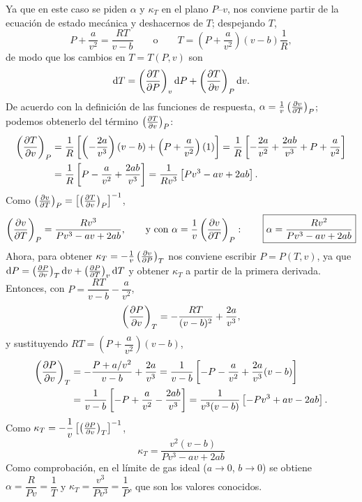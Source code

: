 \begin{solucion}
  Ya que en este caso se piden $\alpha$ y $\kappa_T$ en el plano $P$--$v$, nos conviene partir de la
  ecuación de estado mecánica y deshacernos de $T$; despejando $T$,
  \begin{equation*}
    P+\frac{a}{v^{2}}=\frac{RT}{v-b}\qquad\text{o}\qquad T=\left(P+\frac{a}{v^{2}}\right)(v-b)\frac{1}{R},
  \end{equation*}
  de modo que los cambios en $T=T(P,v)$ son
  \begin{equation*}
    \dd T=\left(\frac{\partial T}{\partial P}\right)_{v}\dd P+\left(\frac{\partial T}{\partial v}\right)_{P}\dd v.
  \end{equation*}
  De acuerdo con la definición de las funciones de respuesta, $\alpha=\frac{1}{v}\left(\frac{\partial v}{\partial T}\right)_{P}$;
  podemos obtenerlo del término $\left(\frac{\partial T}{\partial v}\right)_{P}$:
  \begin{align*}
    \left(\frac{\partial T}{\partial v}\right)_{P}&=\frac{1}{R}\left[\left(-\frac{2a}{v^{3}}\right)(v-b)+\left(P+\frac{a}{v^{2}}\right)(1)\right]
      =\frac{1}{R}\left[-\frac{2a}{v^{2}}+\frac{2ab}{v^{3}}+P+\frac{a}{v^{2}}\right]\\
    &=\frac{1}{R}\left[P-\frac{a}{v^{2}}+\frac{2ab}{v^{3}}\right]
     =\frac{1}{Rv^{3}}\left[Pv^{3}-av+2ab\right].
  \end{align*}
  Como $\left(\frac{\partial v}{\partial T}\right)_{P}=\left[\left(\frac{\partial T}{\partial v}\right)_{P}\right]^{-1}$,
  \begin{equation*}
    \left(\frac{\partial v}{\partial T}\right)_{P}=\frac{Rv^{3}}{Pv^{3}-av+2ab},
    \qquad\text{y con }\alpha=\frac{1}{v}\left(\frac{\partial v}{\partial T}\right)_{P}:\qquad
    \boxed{\alpha=\frac{Rv^{2}}{Pv^{3}-av+2ab}}
  \end{equation*}
  Ahora, para obtener $\kappa_T=-\frac{1}{v}\left(\frac{\partial v}{\partial P}\right)_{T}$ nos conviene escribir $P=P(T,v)$, ya que
  $\dd P=\left(\frac{\partial P}{\partial v}\right)_{T}\dd v+\left(\frac{\partial P}{\partial T}\right)_{v}\dd T$ y obtener $\kappa_T$ a partir de la primera
  derivada. Entonces, con $P=\dfrac{RT}{v-b}-\dfrac{a}{v^{2}}$,
  \begin{equation*}
    \left(\frac{\partial P}{\partial v}\right)_{T}=-\frac{RT}{(v-b)^{2}}+\frac{2a}{v^{3}},
  \end{equation*}
  y sustituyendo $RT=\left(P+\dfrac{a}{v^{2}}\right)(v-b)$,
  \begin{align*}
    \left(\frac{\partial P}{\partial v}\right)_{T}&=-\frac{P+a/v^{2}}{v-b}+\frac{2a}{v^{3}}
      =\frac{1}{v-b}\left[-P-\frac{a}{v^{2}}+\frac{2a}{v^{3}}(v-b)\right]\\
    &=\frac{1}{v-b}\left[-P+\frac{a}{v^{2}}-\frac{2ab}{v^{3}}\right]
     =\frac{1}{v^{3}(v-b)}\left[-Pv^{3}+av-2ab\right].
  \end{align*}
  Como $\kappa_T=-\dfrac{1}{v}\left[\left(\frac{\partial P}{\partial v}\right)_{T}\right]^{-1}$,
  \begin{equation*}
    \boxed{\kappa_T=\frac{v^{2}(v-b)}{Pv^{3}-av+2ab}}
  \end{equation*}
  Como comprobación, en el límite de gas ideal ($a\to0$, $b\to0$) se obtiene $\alpha=\dfrac{R}{Pv}=\dfrac{1}{T}$ y
  $\kappa_T=\dfrac{v^{3}}{Pv^{3}}=\dfrac{1}{P}$, que son los valores conocidos.
\end{solucion}

